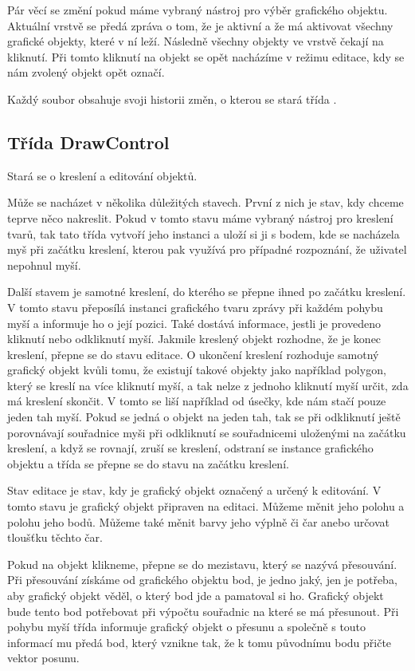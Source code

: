 \documentclass[
  field=inf,
  biblatex=false,
  glossaries,
  index
]{kidiplom}
\begin{document}
Pár věcí se změní pokud máme vybraný nástroj pro výběr grafického objektu. Aktuální vrstvě se předá zpráva o tom, že je aktivní a že má aktivovat všechny grafické objekty, které v ní leží. Následně všechny objekty ve vrstvě čekají na kliknutí. Při tomto kliknutí na objekt se opět nacházíme v režimu editace, kdy se nám zvolený objekt opět označí.

Každý soubor obsahuje svoji historii změn, o kterou se stará třída .

\subsection{Třída DrawControl}

Stará se o kreslení a editování objektů.

Může se nacházet v několika důležitých stavech. První z nich je stav, kdy chceme teprve něco nakreslit. Pokud v tomto stavu máme vybraný nástroj pro kreslení tvarů, tak tato třída vytvoří jeho instanci a uloží si ji s bodem, kde se nacházela myš při začátku kreslení, kterou pak využívá pro případné rozpoznání, že uživatel nepohnul myší. 

Další stavem je samotné kreslení, do kterého se přepne ihned po začátku kreslení. V tomto stavu přeposílá instanci grafického tvaru zprávy při každém pohybu myší a informuje ho o její pozici. Také dostává informace, jestli je provedeno kliknutí nebo odkliknutí myší. Jakmile kreslený objekt rozhodne, že je konec kreslení, přepne se  do stavu editace. O ukončení kreslení rozhoduje samotný grafický objekt kvůli tomu, že existují takové objekty jako například polygon, který se kreslí na více kliknutí myší, a tak nelze z jednoho kliknutí myší určit, zda má kreslení skončit. V tomto se liší například od úsečky, kde nám stačí pouze jeden tah myší. Pokud se jedná o objekt na jeden tah, tak se při odkliknutí ještě porovnávají souřadnice myši při odkliknutí se souřadnicemi uloženými na začátku kreslení, a když se rovnají, zruší se kreslení, odstraní se instance grafického objektu a třída  se přepne se do stavu na začátku kreslení.

Stav editace je stav, kdy je grafický objekt označený a určený k editování. V tomto stavu je grafický objekt připraven na editaci. Můžeme měnit jeho polohu a polohu jeho bodů. Můžeme také měnit barvy jeho výplně či čar anebo určovat tloušťku těchto čar.

Pokud na objekt klikneme, přepne se do mezistavu, který se nazývá přesouvání. Při přesouvání získáme od grafického objektu bod, je jedno jaký, jen je potřeba, aby grafický objekt věděl, o který bod jde a pamatoval si ho. Grafický objekt bude tento bod potřebovat při výpočtu souřadnic na které se má přesunout. Při pohybu myší třída  informuje grafický objekt o přesunu a společně s touto informací mu předá bod, který vznikne tak, že k tomu původnímu bodu přičte vektor posunu.
\end{document}
